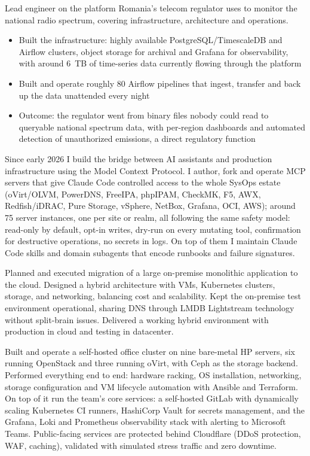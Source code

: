 \documentclass[10pt,a4paper,ragged2e,withhyper]{altacv}
\begin{document}

Lead engineer on the platform Romania's telecom regulator uses to monitor the national radio spectrum, covering infrastructure, architecture and operations.
\begin{itemize}
\item Built the infrastructure: highly available PostgreSQL/TimescaleDB and Airflow clusters, object storage for archival and Grafana for observability, with around 6~TB of time-series data currently flowing through the platform
\item Built and operate roughly 80 Airflow pipelines that ingest, transfer and back up the data unattended every night
\item Outcome: the regulator went from binary files nobody could read to queryable national spectrum data, with per-region dashboards and automated detection of unauthorized emissions, a direct regulatory function
\end{itemize}

Since early 2026 I build the bridge between AI assistants and production infrastructure using the Model Context Protocol. I author, fork and operate MCP servers that give Claude Code controlled access to the whole SysOps estate (oVirt/OLVM, PowerDNS, FreeIPA, phpIPAM, CheckMK, F5, AWX, Redfish/iDRAC, Pure Storage, vSphere, NetBox, Grafana, OCI, AWS); around 75 server instances, one per site or realm, all following the same safety model: read-only by default, opt-in writes, dry-run on every mutating tool, confirmation for destructive operations, no secrets in logs. On top of them I maintain Claude Code skills and domain subagents that encode runbooks and failure signatures.

Planned and executed migration of a large on-premise monolithic application to the cloud. Designed a hybrid architecture with VMs, Kubernetes clusters, storage, and networking, balancing cost and scalability. Kept the on-premise test environment operational, sharing DNS through LMDB Lightstream technology without split-brain issues. Delivered a working hybrid environment with production in cloud and testing in datacenter.

Built and operate a self-hosted office cluster on nine bare-metal HP servers, six running OpenStack and three running oVirt, with Ceph as the storage backend. Performed everything end to end: hardware racking, OS installation, networking, storage configuration and VM lifecycle automation with Ansible and Terraform. On top of it run the team's core services: a self-hosted GitLab with dynamically scaling Kubernetes CI runners, HashiCorp Vault for secrets management, and the Grafana, Loki and Prometheus observability stack with alerting to Microsoft Teams. Public-facing services are protected behind Cloudflare (DDoS protection, WAF, caching), validated with simulated stress traffic and zero downtime.
\end{document}
